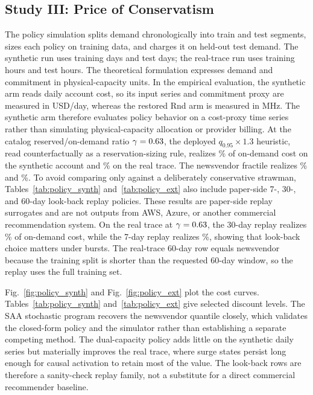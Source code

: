 \documentclass[conference]{IEEEtran}
\begin{document}
\subsection{Study III: Price of Conservatism}
\label{sec:policy}
The policy simulation splits demand chronologically into train and test
segments, sizes each policy on training data, and charges it on held-out test
demand. The synthetic run uses \polTrainDays{} training days and
\polTestDays{} test days; the real-trace run uses \extPolTrainDays{} training
hours and \extPolTestDays{} test hours. The theoretical formulation expresses
demand and commitment in physical-capacity units. In the empirical
evaluation, the synthetic arm reads daily account cost, so its input series
and commitment proxy are measured in USD/day, whereas the restored Rnd arm is
measured in MHz. The synthetic arm therefore evaluates policy behavior on a
cost-proxy time series rather than simulating physical-capacity allocation or
provider billing. At the catalog reserved/on-demand
ratio $\gamma=0.63$, the deployed $q_{0.95}\times1.3$ heuristic,
read counterfactually as a reservation-sizing rule, realizes \polPctHeur\%
of on-demand cost on the synthetic account and \extPolPctHeur\% on the real
trace. The newsvendor fractile realizes \polPctNv\% and \extPolPctNv\%.
To avoid comparing only against a deliberately conservative strawman,
Tables~\ref{tab:policy_synth} and~\ref{tab:policy_ext} also include
paper-side 7-, 30-, and 60-day look-back replay policies. These results are
paper-side replay surrogates and are not outputs from AWS, Azure, or another
commercial recommendation system. On the real
trace at $\gamma=0.63$, the 30-day replay realizes
\extPolPctLookThirty\% of on-demand cost, while the 7-day replay realizes
\extPolPctLookSeven\%, showing that look-back choice matters under bursts.
The real-trace 60-day row equals newsvendor because the training split is
shorter than the requested 60-day window, so the replay uses the full training
set.

Fig.~\ref{fig:policy_synth} and Fig.~\ref{fig:policy_ext} plot the cost curves.
Tables~\ref{tab:policy_synth} and~\ref{tab:policy_ext} give selected
discount levels. The SAA stochastic program recovers the newsvendor quantile
closely, which validates the closed-form policy and the simulator rather
than establishing a separate competing method. The dual-capacity policy adds
little on the synthetic daily series but materially improves the real trace,
where surge states persist long enough for causal activation to retain most
of the value. The look-back rows are therefore a sanity-check replay family,
not a substitute for a direct commercial recommender baseline.
\end{document}
